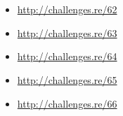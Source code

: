 \section{\Exercises}

\begin{itemize}
	\item \url{http://challenges.re/62}
	\item \url{http://challenges.re/63}
	\item \url{http://challenges.re/64}
	\item \url{http://challenges.re/65}
	\item \url{http://challenges.re/66}
\end{itemize}

